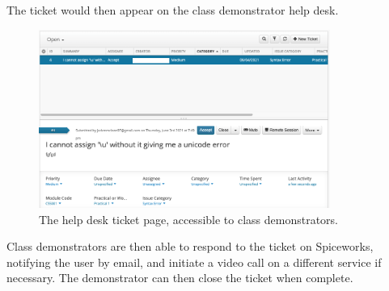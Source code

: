 The ticket would then appear on the class demonstrator help desk.

\FloatBarrier
\begin{figure}[H]
  \centering
  \includegraphics[width=0.85\textwidth]{2context/images/SWticketPage.png}
  \caption{The help desk ticket page, accessible to class demonstrators.}
\end{figure}

Class demonstrators are then able to respond to the ticket on Spiceworks, notifying the user by email, and initiate a video call on a different service if necessary. The demonstrator can then close the ticket when complete.

